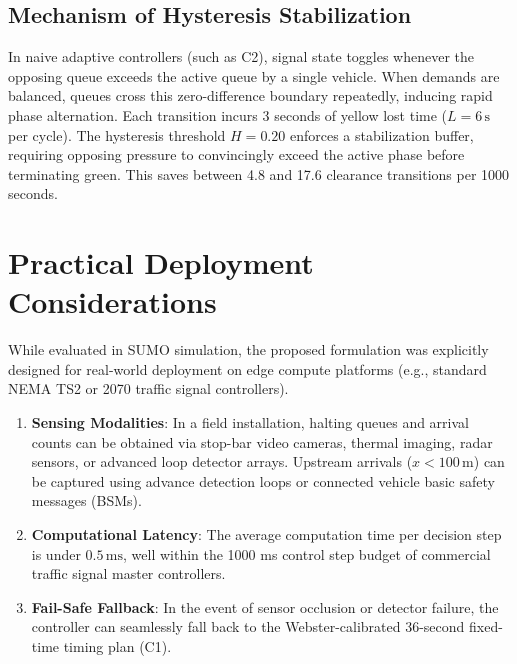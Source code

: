 \documentclass[11pt,journal,onecolumn]{article}
\begin{document}
\subsection{Mechanism of Hysteresis Stabilization}
In naive adaptive controllers (such as C2), signal state toggles whenever the opposing queue exceeds the active queue by a single vehicle. When demands are balanced, queues cross this zero-difference boundary repeatedly, inducing rapid phase alternation. Each transition incurs 3 seconds of yellow lost time ($L = 6\,\text{s}$ per cycle). The hysteresis threshold $H = 0.20$ enforces a stabilization buffer, requiring opposing pressure to convincingly exceed the active phase before terminating green. This saves between 4.8 and 17.6 clearance transitions per 1000 seconds.

\section{Practical Deployment Considerations}
While evaluated in SUMO simulation, the proposed formulation was explicitly designed for real-world deployment on edge compute platforms (e.g., standard NEMA TS2 or 2070 traffic signal controllers).
\begin{enumerate}
    \item \textbf{Sensing Modalities}: In a field installation, halting queues and arrival counts can be obtained via stop-bar video cameras, thermal imaging, radar sensors, or advanced loop detector arrays. Upstream arrivals ($x < 100\,\text{m}$) can be captured using advance detection loops or connected vehicle basic safety messages (BSMs).
    \item \textbf{Computational Latency}: The average computation time per decision step is under $0.5\,\text{ms}$, well within the 1000 ms control step budget of commercial traffic signal master controllers.
    \item \textbf{Fail-Safe Fallback}: In the event of sensor occlusion or detector failure, the controller can seamlessly fall back to the Webster-calibrated 36-second fixed-time timing plan (C1).
\end{enumerate}
\end{document}
